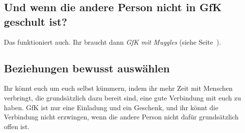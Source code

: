 \subsection{Und wenn die andere Person nicht in GfK geschult ist?}

Das funktioniert auch. Ihr braucht dann \emph{GfK mit Muggles} (siehe Seite~\pageref{gfk-mit-muggles}).


\subsection{Beziehungen bewusst auswählen}

Ihr könnt euch um euch selbst kümmern, indem ihr mehr Zeit mit Menschen verbringt, die grundsätzlich dazu bereit sind, eine gute Verbindung mit euch zu haben. GfK ist nur eine Einladung und ein Geschenk, und ihr könnt die Verbindung nicht erzwingen, wenn die andere Person nicht dafür grundsätzlich offen ist.
